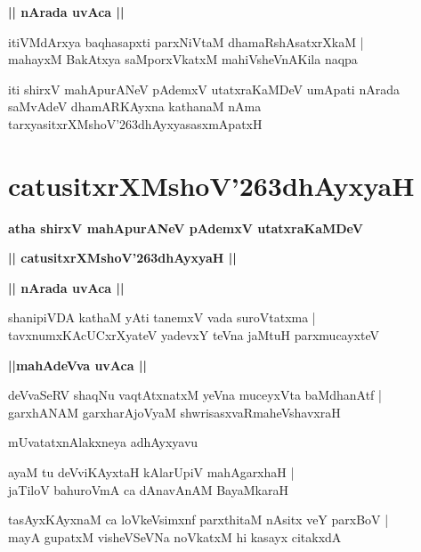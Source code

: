 \documentclass[twoside,12pt,openright]{book}
\def\S{\char'263}
\newcounter{shloka}[chapter]
\def\uvaca#1{\centerline{{\large\textbf{#1}}}}
\begin{document}
\uvaca{|| nArada uvAca ||}

\begin{shloka}%
itiVMdArxya baqhasapxti parxNiVtaM dhamaRshAsatxrXkaM |\\
mahayxM BakAtxya saMporxVkatxM mahiVsheVnAKila naqpa
\end{shloka}

\begin{center}
iti shirxV mahApurANeV pAdemxV utatxraKaMDeV umApati nArada saMvAdeV  
dhamARKAyxna kathanaM nAma tarxyasitxrXMshoV\S dhAyxyasasxmApatxH
\end{center}

\chapter{catusitxrXMshoV\S dhAyxyaH}

\begin{center}
{\LARGE\bfseries atha shirxV mahApurANeV pAdemxV utatxraKaMDeV}
\end{center}

\begin{center}
{\LARGE\bfseries || catusitxrXMshoV\S dhAyxyaH ||}
\end{center}

\uvaca{|| nArada uvAca ||}


\begin{shloka}%
shanipiVDA kathaM yAti tanemxV vada suroVtatxma |\\
tavxnumxKAcUCxrXyateV yadevxY teVna jaMtuH parxmucayxteV 
\end{shloka}

\uvaca{||mahAdeVva uvAca ||}

\begin{shloka}%
deVvaSeRV shaqNu vaqtAtxnatxM yeVna muceyxVta baMdhanAtf |\\
garxhANAM garxharAjoVyaM shwrisasxvaRmaheVshavxraH 
\end{shloka}

\begin{center}
mUvatatxnAlakxneya adhAyxyavu
\end{center}

\begin{shloka}%
ayaM tu deVviKAyxtaH kAlarUpiV mahAgarxhaH |\\
jaTiloV bahuroVmA ca dAnavAnAM BayaMkaraH 
\end{shloka}

\begin{shloka}%
tasAyxKAyxnaM ca loVkeVsimxnf parxthitaM nAsitx veY parxBoV |\\
mayA gupatxM visheVSeVNa noVkatxM hi kasayx citakxdA
\end{shloka}
\end{document}
